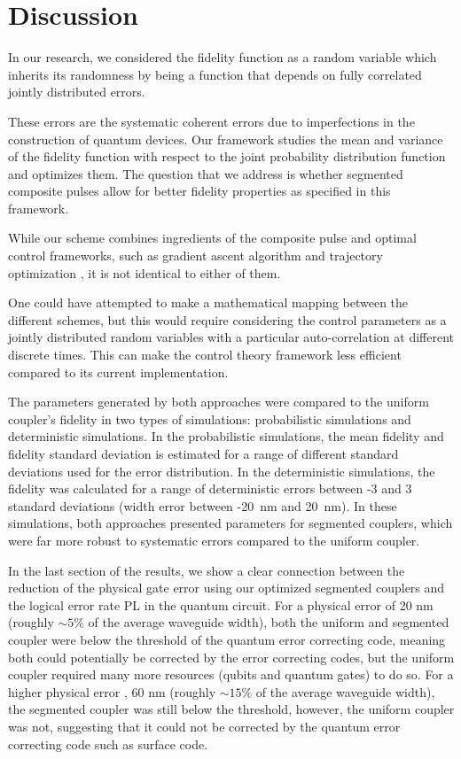 \documentclass[floatfix,reprint, amsmath,amssymb,aps,superscriptaddress,nofootinbib]{revtex4-2}
\begin{document}
\newpage

\section{Discussion \label{sec: Discussion}}

In our research, we considered the fidelity function as a random variable which inherits its randomness by being a function that depends on fully correlated jointly distributed errors. 

These errors are the systematic coherent errors due to imperfections in the construction of quantum devices. Our framework studies the mean and variance of the fidelity function with respect to the joint probability distribution function and optimizes them. The question that we address is whether segmented composite pulses allow for better fidelity properties as specified in this framework. 

While our scheme combines ingredients of the composite pulse and optimal control frameworks, such as gradient ascent algorithm \cite{KHANEJA2005296, chen2022iterative} and trajectory optimization \cite{propson2021robust}, it is not identical to either of them. 

One could have attempted to make a mathematical mapping between the different schemes, but this would require considering the control parameters as a jointly distributed random variables with a particular auto-correlation at different discrete times. This can make the control theory framework less efficient compared to its current implementation.

The parameters generated by both approaches were compared to the uniform coupler's fidelity in two types of simulations: probabilistic simulations and deterministic simulations.
In the probabilistic simulations, the mean fidelity and fidelity standard deviation is estimated for a range of different standard deviations used for the error distribution.
In the deterministic simulations, the fidelity was calculated for a range of deterministic errors between -3 and 3 standard deviations (width error between -20~nm and 20~nm).
In these simulations, both approaches presented parameters for segmented couplers, which were far more robust to systematic errors compared to the uniform coupler. 


In the last section of the results, we show a clear connection between the reduction of the physical gate error using our optimized segmented couplers and the logical error rate PL in the quantum circuit. For a physical error  of 20 nm (roughly $\sim 5\%$ of the average waveguide width), both the uniform and segmented coupler were below the threshold of the quantum error correcting code, meaning both could potentially be corrected by the error correcting codes, but the uniform coupler required many more resources (qubits and quantum gates) to do so.
For a higher physical error , 60 nm  (roughly $\sim 15\%$ of the average waveguide width), the segmented coupler was still below the threshold, however, the uniform coupler was not, suggesting that it could not be corrected by the quantum error correcting code such as surface code.
\end{document}
